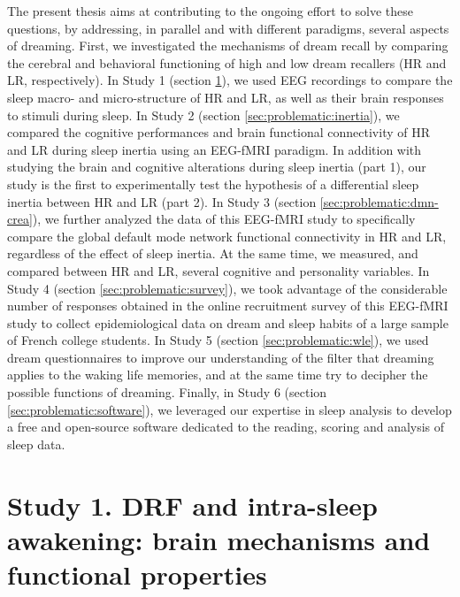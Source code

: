 The present thesis aims at contributing to the ongoing effort to solve these questions, by addressing, in parallel and with different paradigms, several aspects of dreaming. First, we investigated the mechanisms of dream recall by comparing the cerebral and behavioral functioning of high and low dream recallers (HR and LR, respectively). In Study 1 (section \ref{sec:problematic:arousals}), we used EEG recordings to compare the sleep macro- and micro-structure of HR and LR, as well as their brain responses to stimuli during sleep. In Study 2 (section \ref{sec:problematic:inertia}), we compared the cognitive performances and brain functional connectivity of HR and LR during sleep inertia using an EEG-fMRI paradigm. In addition with studying the brain and cognitive alterations during sleep inertia (part 1), our study is the first to experimentally test the hypothesis of a differential sleep inertia between HR and LR (part 2). In Study 3 (section \ref{sec:problematic:dmn-crea}), we further analyzed the data of this EEG-fMRI study to specifically compare the global default mode network functional connectivity in HR and LR, regardless of the effect of sleep inertia. At the same time, we measured, and compared between HR and LR, several cognitive and personality variables. In Study 4 (section \ref{sec:problematic:survey}), we took advantage of the considerable number of responses obtained in the online recruitment survey of this EEG-fMRI study to collect epidemiological data on dream and sleep habits of a large sample of French college students. In Study 5 (section \ref{sec:problematic:wle}), we used dream questionnaires to improve our understanding of the filter that dreaming applies to the waking life memories, and at the same time try to decipher the possible functions of dreaming. Finally, in Study 6 (section \ref{sec:problematic:software}), we leveraged our expertise in sleep analysis to develop a free and open-source software dedicated to the reading, scoring and analysis of sleep data.

\section{Study 1. DRF and intra-sleep awakening: brain mechanisms and functional properties}
\label{sec:problematic:arousals}

